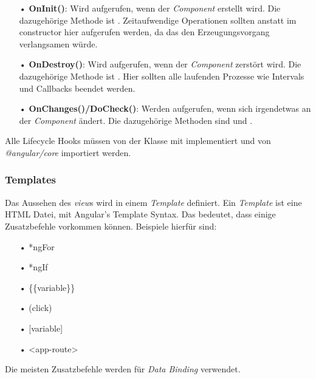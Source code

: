\begin{itemize}
\item[•] \textbf{OnInit()}: Wird aufgerufen, wenn der \textit{Component} erstellt wird. Die dazugehörige Methode ist . Zeitaufwendige Operationen sollten anstatt im constructor hier aufgerufen werden, da das den Erzeugungsvorgang verlangsamen würde.
\item[•] \textbf{OnDestroy()}: Wird aufgerufen, wenn der \textit{Component} zerstört wird. Die dazugehörige Methode ist . Hier sollten alle laufenden Prozesse wie Intervals und Callbacks beendet werden.
\item[•] \textbf{OnChanges()/DoCheck()}: Werden aufgerufen, wenn sich irgendetwas an der \textit{Component} ändert. Die dazugehörige Methoden sind  und .
\end{itemize}

Alle Lifecycle Hooks müssen von der Klasse mit  implementiert und von \textit{@angular/core} importiert werden.

\subsubsection{Templates}
\label{sec:ang-templates}
Das Aussehen des \textit{view}s wird in einem \textit{Template} definiert. Ein \textit{Template} ist eine \ac{HTML} Datei, mit Angular's Template Syntax. Das bedeutet, dass einige Zusatzbefehle vorkommen können. Beispiele hierfür sind:

\begin{itemize}
\item[•]*ngFor
\item[•]*ngIf
\item[•]\{\{variable\}\}
\item[•](click)
\item[•][variable]
\item[•]<app-route>
\end{itemize}

Die meisten Zusatzbefehle werden für \textit{Data Binding} verwendet.

